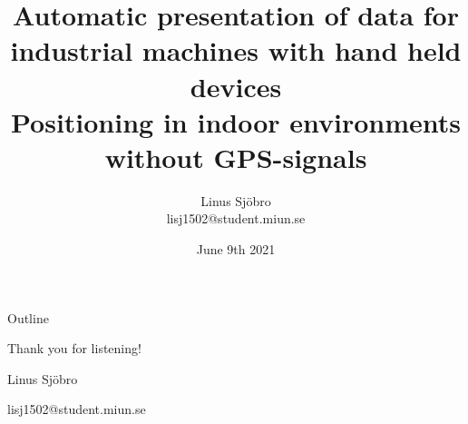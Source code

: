 \documentclass[aspectratio=169]{beamer}
\title{Automatic presentation of data for industrial machines with hand held devices \\ \large{Positioning in indoor environments without GPS-signals}}
\date{June 9th 2021}
\author{Linus Sjöbro \\ \tiny{lisj1502@student.miun.se}}
\institute{Mid Sweden University \figNoCap{0.2}{miunLogo}}
\begin{document}
  \maketitle
  
  \begin{frame}{Outline}
  \tableofcontents
  \end{frame}

  
  
  
  
  

  
  \begin{frame}[standout]
  Thank you for listening!

  \small{Linus Sjöbro
  
  lisj1502@student.miun.se}
  \end{frame}
\end{document}
